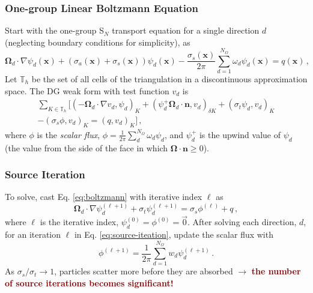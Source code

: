 \documentclass[xcolor={usenames,dvipsnames,svgnames,table}, 10pt]{beamer}
\newcommand{\vx}{\mathbf{x}} %
\newcommand{\vo}{\pmb{\Omega}} %
\newcommand{\vn}{\mathbf{n}} %
\newcommand{\pinp}[2]{\left(#1,#2\right)}
\begin{document}
\begin{frame}\frametitle{One-group Linear Boltzmann Equation}
	Start with the one-group S$_N$ transport equation for a single direction $d$ (neglecting boundary conditions for simplicity), as
	\begin{equation}
		\label{eq:boltzmann}
		\vo_d \cdot \nabla \psi_d(\vx) + \left(\sigma_a(\vx) + \sigma_s(\vx)\right) \psi_d(\vx) - \frac{\sigma_s(\vx)}{2\pi} \sum_{d = 1}^{N_\Omega} \omega_d \psi_d(\vx) = q(\vx)\,,
	\end{equation}
	Let $\mathbb{T}_h$ be the set of all cells of the triangulation in a discontinuous approximation space. The DG weak form with test function $v_d$ is
	\begin{multline}
		\sum_{K \in \mathbb{T}_h} \Big[ \pinp{-\vo_d \cdot \nabla v_d}{\psi_d}_K + \pinp{\psi_d^+ \vo_d \cdot \vn}{v_d}_{\delta K} + \pinp{\sigma_t \psi_d}{v_d}_K  \\ - \pinp{\sigma_s \phi}{v_d}_K = \pinp{q}{v_d}_K\Big]\,,
	\end{multline}
	where $\phi$ is the \textit{scalar flux}, $\phi = \frac{1}{2\pi} \sum_d^{N_\Omega} \omega_d \psi_d$, and $\psi_d^+$ is the upwind value of $\psi_d$ (the value from the side of the face in which $\vo \cdot \vn \geq 0$).
\end{frame}


\begin{frame}\frametitle{Source Iteration}
	To solve, cast Eq. \eqref{eq:boltzmann} with iterative index $\ell$ as
	\begin{equation}
		\label{eq:source-iteation}
		\vo_d \cdot \nabla \psi_d^{(\ell + 1)} + \sigma_t \psi_d^{(\ell + 1)} = \sigma_s \phi^{(\ell)} + q\,,
	\end{equation}
	where $\ell$ is the iterative index, $\psi_d^{(0)} = \phi^{(0)} = \vec{0}$. After solving each direction, $d$, for an iteration $\ell$ in Eq. \eqref{eq:source-iteation}, update the scalar flux with
	\[
		\phi^{(\ell + 1)} = \frac{1}{2\pi} \sum_{d = 1}^{N_\Omega} w_d \psi_d^{(\ell + 1)}\,.
	\]
	As $\sigma_s / \sigma_t \to 1$, particles scatter more before they are absorbed $\rightarrow$ \textbf{\textcolor{Maroon}{the number of source iterations becomes significant!}} 
\end{frame}

\end{document}
